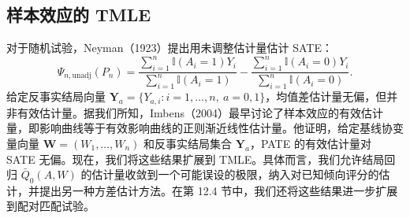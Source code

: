 \subsection{样本效应的 TMLE}

对于随机试验，Neyman（1923）提出用未调整估计量估计 SATE：
\[
\Psi_{n,\mathrm{unadj}}(P_n)
=\frac{\sum_{i=1}^n\mathbb I(A_i=1)Y_i}{\sum_{i=1}^n\mathbb I(A_i=1)}
-\frac{\sum_{i=1}^n\mathbb I(A_i=0)Y_i}{\sum_{i=1}^n\mathbb I(A_i=0)}.
\]
给定反事实结局向量 $\mathbf Y_a=\{Y_{a,i}:i=1,\ldots,n,\ a=0,1\}$，均值差估计量无偏，但并非有效估计量。据我们所知，Imbens（2004）最早讨论了样本效应的有效估计量，即影响曲线等于有效影响曲线的正则渐近线性估计量。他证明，给定基线协变量向量 $\mathbf W=(W_1,\ldots,W_n)$ 和反事实结局集合 $\mathbf Y_a$，PATE 的有效估计量对 SATE 无偏。现在，我们将这些结果扩展到 TMLE。具体而言，我们允许结局回归 $\bar Q_0(A,W)$ 的估计量收敛到一个可能误设的极限，纳入对已知倾向评分的估计，并提出另一种方差估计方法。在第 12.4 节中，我们还将这些结果进一步扩展到配对匹配试验。

